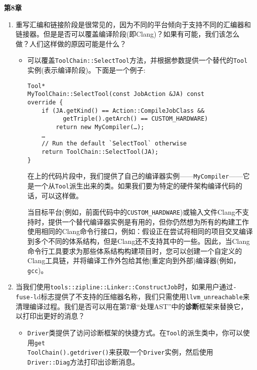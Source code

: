 \newpage
\noindent
\textbf{第8章}

\begin{enumerate}
\item 重写汇编和链接阶段是很常见的，因为不同的平台倾向于支持不同的汇编器和链接器。但是是否可以覆盖编译阶段(即Clang)？如果有可能，我们该怎么做？人们这样做的原因可能是什么？

\begin{itemize}
\item 可以覆盖\texttt{ToolChain::SelectTool}方法，并根据参数提供一个替代的\texttt{Tool}实例(表示编译阶段)。下面是一个例子:

\begin{lstlisting}[style=styleCXX]
Tool*
MyToolChain::SelectTool(const JobAction &JA) const
override {
	if (JA.getKind() == Action::CompileJobClass &&
		  getTriple().getArch() == CUSTOM_HARDWARE)
		return new MyCompiler(…);
	…
	// Run the default `SelectTool` otherwise
	return ToolChain::SelectTool(JA);
}
\end{lstlisting}

在上的代码片段中，我们提供了自己的编译器实例——\texttt{MyCompiler}——它是一个从\texttt{Tool}派生出来的类。如果我们要为特定的硬件架构编译代码的话，可以这样做。

当目标平台(例如，前面代码中的\texttt{CUSTOM\_HARDWARE})或输入文件Clang不支持时，提供一个替代编译器实例是有用的，但你仍然想为所有的构建工作使用相同的Clang命令行接口，例如：假设正在尝试将相同的项目交叉编译到多个不同的体系结构，但是Clang还不支持其中的一些。因此，当Clang命令行工具要求为那些体系结构构建项目时，您可以创建一个自定义的Clang工具链，并将编译工作外包给其他(重定向到外部)编译器(例如，\texttt{gcc})。

\end{itemize}

\item 当我们使用\texttt{tools::zipline::Linker::ConstructJob}时，如果用户通过\texttt{-fuse-l}d标志提供了不支持的压缩器名称，我们只需使用\texttt{llvm\_unreachable}来清理编译过程。我们是否可以用在第7章“处理AST”中的\textbf{诊断}框架来替换它，以打印出更好的消息？

\begin{itemize}
\item \texttt{Driver}类提供了访问诊断框架的快捷方式。在\texttt{Tool}的派生类中，你可以使用\texttt{get\\ToolChain().getdriver()}来获取一个\texttt{Driver}实例，然后使用\texttt{Driver::Diag}方法打印出诊断消息。
\end{itemize}


\end{enumerate}
